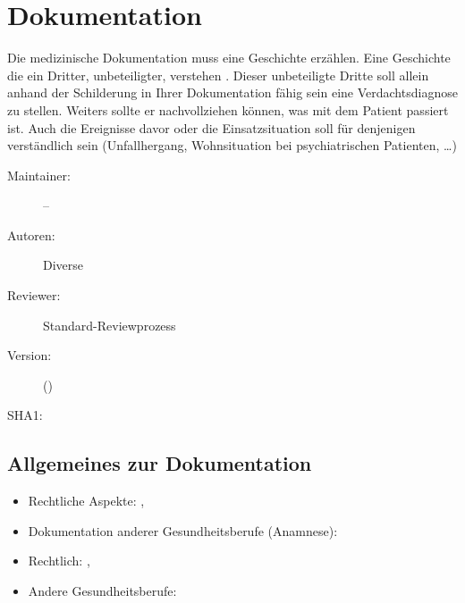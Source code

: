 \def\ChapterCode{DOK}
\chapter
[\CO{[DOK]} Dokumentation]
{Dokumentation}
\label{chp:EIN}

\ChapterIntro
{%
Die medizinische Dokumentation
muss eine Geschichte erzählen. Eine Geschichte die ein
Dritter, unbeteiligter, verstehen . Dieser
unbeteiligte Dritte soll allein anhand der
Schilderung in Ihrer Dokumentation fähig sein eine
Verdachtsdiagnose zu stellen. Weiters sollte er
nachvollziehen können, was mit dem Patient passiert ist.
Auch die Ereignisse davor oder die Einsatzsituation soll
für denjenigen verständlich sein (Unfallhergang,
Wohnsituation bei psychiatrischen Patienten, \ldots)
}
{%
\begin{description}
  \item[Maintainer:] --
  \item[Autoren:] Diverse
  \item[Reviewer:] Standard-Reviewprozess
  \item[Version:] {\DocVersion} ({\DocVersionInfo})
  \item[SHA1:] {\DocGitCommit}
\end{description}

{\TxTeilkapitelAASS}
}








% 
% 
% 
% 
% 
% 

\clearpage %

\section{Allgemeines zur Dokumentation}

\label{topic:dokumentation-medizinisch}

{%
\begin{itemize}
  \item Rechtliche Aspekte:
  ,
  \item Dokumentation anderer Gesundheitsberufe (Anamnese):
\end{itemize}
}{%
\begin{itemize}
  \item Rechtlich:
  ,
  \item Andere Gesundheitsberufe:
\end{itemize}
}{}{}{}

